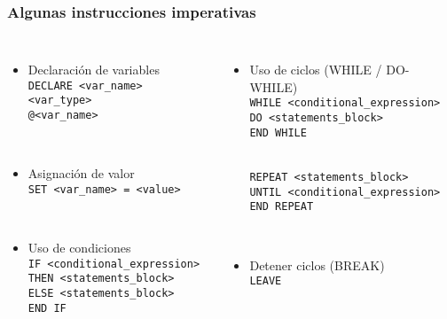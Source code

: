 
\begin{frame}[fragile]
	
	\frametitle{Algunas instrucciones imperativas}
	
	\begin{columns}[t]
		
			\begin{itemize}
			
			\item Declaración de variables \\
			\texttt{\textcolor{codepurple}{DECLARE} <var\_name> <var\_type>} \\ 
			\texttt{\textcolor{codepurple}{@}<var\_name>}
			
			\pause
			\ 
			
			\item  Asignación de valor \\ 
			\texttt{\textcolor{codepurple}{SET} <var\_name> = <value>}
			
			\pause
			\ 
			
			\item  Uso de condiciones \\
			\texttt{\textcolor{codepurple}{IF} <conditional\_expression> \\ 
				\textcolor{codepurple}{THEN} <statements\_block> \\ 
				\textcolor{codepurple}{ELSE} <statements\_block> \\ 
				\textcolor{codepurple}{END IF}}
			
		\end{itemize}
		
		
			\begin{itemize}
				
			\pause 
						
			\item Uso de ciclos (WHILE / DO-WHILE)\\
			\texttt{\textcolor{codepurple}{WHILE}  <conditional\_expression>  \\
			\textcolor{codepurple}{DO}  <statements\_block> \\
			\textcolor{codepurple}{END WHILE}} \\
			
			\ 
			
			\texttt{\textcolor{codepurple}{REPEAT}  <statements\_block>  \\
			\textcolor{codepurple}{UNTIL} <conditional\_expression> \\
			\textcolor{codepurple}{END REPEAT}}
			
			\pause
			\ 
			
			\item Detener ciclos (BREAK)\\ 
			\texttt{\textcolor{codepurple}{LEAVE}}
			
		\end{itemize}
		
	\end{columns}
	
\end{frame}

